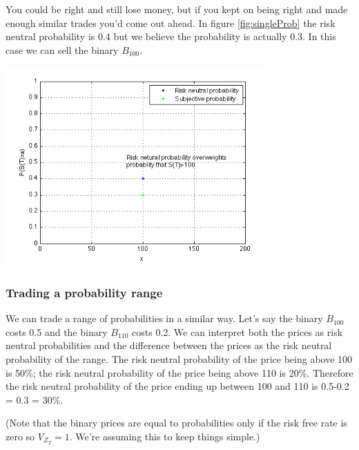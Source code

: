 You could be right and still lose money, but if you kept on being right and made enough similar trades you'd come out ahead. In figure \ref{fig:singleProb} the risk neutral probability is 0.4 but we believe the probability is actually 0.3. In this case we can sell the binary $B_{100}$.

 \begin{center}
\includegraphics[width=4in]{pics/singleProb}%
\label{fig:singleProb}%
\end{center}



\subsubsection{Trading a probability range}

We can trade a range of probabilities in a similar way. Let's say the binary $B_{100}$ costs 0.5 and the binary $B_{110}$ costs 0.2. We can interpret both the prices as risk neutral probabilities and the difference between the prices as the risk neutral probability of the range. The risk neutral probability of the price being above 100 is 50\%; the risk neutral probability of the price being above 110 is 20\%. Therefore the risk neutral probability of the price ending up between 100 and 110 is 0.5-0.2 = 0.3 = 30\%. 


(Note that the binary prices are equal to probabilities only if the risk free rate is zero so $V_{Z_T}=1$. We're assuming this to keep things simple.)

